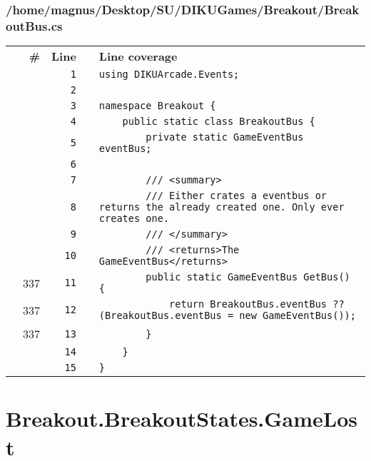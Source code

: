 \documentclass[a4paper,landscape,10pt]{article}
\begin{document}
\subsubsection{/home/magnus/Desktop/SU/DIKUGames/Breakout/BreakoutBus.cs}
\begin{longtable}[l]{lrrll}
\textbf{} & \textbf{\#} & \textbf{Line} & \textbf{} & \textbf{Line coverage}\\
\cellcolor{gray} &  & \verb~1~ & & \verb~using DIKUArcade.Events;~\\
\cellcolor{gray} &  & \verb~2~ & & \verb~~\\
\cellcolor{gray} &  & \verb~3~ & & \verb~namespace Breakout {~\\
\cellcolor{gray} &  & \verb~4~ & & \verb~    public static class BreakoutBus {~\\
\cellcolor{gray} &  & \verb~5~ & & \verb~        private static GameEventBus eventBus;~\\
\cellcolor{gray} &  & \verb~6~ & & \verb~~\\
\cellcolor{gray} &  & \verb~7~ & & \verb~        /// <summary>~\\
\cellcolor{gray} &  & \verb~8~ & & \verb~        /// Either crates a eventbus or returns the already created one. Only ever creates one.~\\
\cellcolor{gray} &  & \verb~9~ & & \verb~        /// </summary>~\\
\cellcolor{gray} &  & \verb~10~ & & \verb~        /// <returns>The GameEventBus</returns>~\\
\cellcolor{green} & 337 & \verb~11~ & & \verb~        public static GameEventBus GetBus() {~\\
\cellcolor{green} & 337 & \verb~12~ & & \verb~            return BreakoutBus.eventBus ?? (BreakoutBus.eventBus = new GameEventBus());~\\
\cellcolor{green} & 337 & \verb~13~ & & \verb~        }~\\
\cellcolor{gray} &  & \verb~14~ & & \verb~    }~\\
\cellcolor{gray} &  & \verb~15~ & & \verb~}~\\
\end{longtable}
\newpage
\section{Breakout.BreakoutStates.GameLost}
\end{document}
